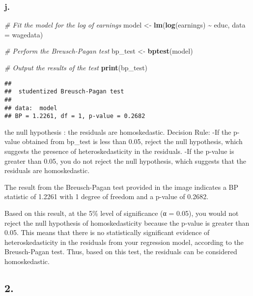 \documentclass[
]{article}
\newenvironment{Shaded}{\begin{snugshade}}{\end{snugshade}}
\newcommand{\AttributeTok}[1]{\textcolor[rgb]{0.13,0.29,0.53}{#1}}
\newcommand{\CommentTok}[1]{\textcolor[rgb]{0.56,0.35,0.01}{\textit{#1}}}
\newcommand{\FunctionTok}[1]{\textcolor[rgb]{0.13,0.29,0.53}{\textbf{#1}}}
\newcommand{\NormalTok}[1]{#1}
\newcommand{\OtherTok}[1]{\textcolor[rgb]{0.56,0.35,0.01}{#1}}
\newcommand{\SpecialCharTok}[1]{\textcolor[rgb]{0.81,0.36,0.00}{\textbf{#1}}}
\begin{document}
\hypertarget{j.}{%
\subsubsection{j.}\label{j.}}

\begin{Shaded}
\begin{Highlighting}[]
\CommentTok{\# Fit the model for the log of earnings}
\NormalTok{model }\OtherTok{\textless{}{-}} \FunctionTok{lm}\NormalTok{(}\FunctionTok{log}\NormalTok{(earnings) }\SpecialCharTok{\textasciitilde{}}\NormalTok{ educ, }\AttributeTok{data =}\NormalTok{ wagedata)}

\CommentTok{\# Perform the Breusch{-}Pagan test}
\NormalTok{bp\_test }\OtherTok{\textless{}{-}} \FunctionTok{bptest}\NormalTok{(model)}

\CommentTok{\# Output the results of the test}
\FunctionTok{print}\NormalTok{(bp\_test)}
\end{Highlighting}
\end{Shaded}

\begin{verbatim}
## 
##  studentized Breusch-Pagan test
## 
## data:  model
## BP = 1.2261, df = 1, p-value = 0.2682
\end{verbatim}

the null hypothesis : the residuals are homoskedastic. Decision Rule:
-If the p-value obtained from bp\_test is less than 0.05, reject the
null hypothesis, which suggests the presence of heteroskedasticity in
the residuals. -If the p-value is greater than 0.05, you do not reject
the null hypothesis, which suggests that the residuals are
homoskedastic.

The result from the Breusch-Pagan test provided in the image indicates a
BP statistic of 1.2261 with 1 degree of freedom and a p-value of 0.2682.

Based on this result, at the 5\% level of significance (α = 0.05), you
would not reject the null hypothesis of homoskedasticity because the
p-value is greater than 0.05. This means that there is no statistically
significant evidence of heteroskedasticity in the residuals from your
regression model, according to the Breusch-Pagan test. Thus, based on
this test, the residuals can be considered homoskedastic.

\hypertarget{section-1}{%
\subsection{2.}\label{section-1}}
\end{document}
